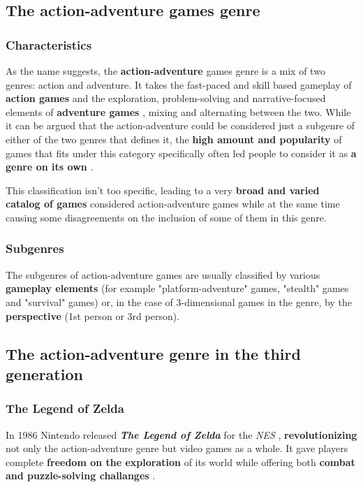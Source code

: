 \documentclass[a4paper,10pt]{book}
\begin{document}
 \subsection{The action-adventure games genre }
 
 \subsubsection{Characteristics }
 
 
          As the name suggests, the  \textbf{action-adventure }  games genre is a mix of two genres: action and adventure. It takes the fast-paced and skill based gameplay of  \textbf{action games }  and the exploration,
          problem-solving and narrative-focused elements of  \textbf{adventure games } , mixing and alternating between the two. While it can be argued that the action-adventure could be considered
          just a subgenre of either of the two genres that defines it, the  \textbf{high amount and popularity }  of games that fits under this category specifically often led people to consider it as  \textbf{a genre on its own } .  
 
          This classification isn't too specific, leading to a very  \textbf{broad and varied catalog of games }  considered action-adventure games while at the same time causing some disagreements
          on the inclusion of some of them in this genre.
         
 
 \subsubsection{Subgenres }
 
 
          The subgenres of action-adventure games are usually classified by various  \textbf{gameplay elements }  (for example "platform-adventure" games, "stealth" games and "survival" games) or,
          in the case of 3-dimensional games in the genre, by the  \textbf{perspective }  (1st person or 3rd person).
         
 
 \subsection{The action-adventure genre in the third generation }
 
 \subsubsection{The Legend of Zelda }
 
 
          In 1986 Nintendo released  \textbf{\textit{The Legend of Zelda }}  for the  \textit{NES },  \textbf{revolutionizing }  not only the action-adventure genre but video games as a whole.
          It gave players complete  \textbf{freedom on the exploration }  of its world while offering both  \textbf{combat and puzzle-solving challanges } .  
 
\end{document}
